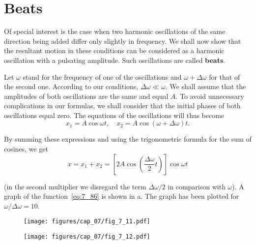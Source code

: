 \section{Beats}\label{sec:7_8}

Of special interest is the case when two harmonic oscillations of the same direction being added differ only slightly in frequency. We shall now show that the resultant motion in these conditions can be considered as a harmonic oscillation with a pulsating amplitude. Such oscillations are called \textbf{beats}.

Let $\omega$ stand for the frequency of one of the oscillations and $\omega+\Delta\omega$ for that of the second one. According to our conditions, $\Delta\omega\ll\omega$. We shall assume that the amplitudes of both oscillations are the same and equal $A$. To avoid unnecessary complications in our formulas, we shall consider that the initial phases of both oscillations equal zero. The equations of the oscillations will thus become
\begin{equation*}
	x_1 = A\cos\omega t,\quad x_2 = A\cos(\omega+\Delta\omega) t.
\end{equation*}

\noindent
By summing these expressions and using the trigonometric formula for the sum of cosines, we get
\begin{equation}\label{eq:7_86}
	x = x_1 + x_2 = \left[ 2A \cos\left(\frac{\Delta\omega}{2}t\right)\right] \cos\omega t
\end{equation}

\noindent
(in the second multiplier we disregard the term $\Delta\omega/2$ in comparison with $\omega$). A graph of the function~\eqref{eq:7_86} is shown in a. The graph has been plotted for $\omega/\Delta\omega=10$.

\begin{figure}[t]
	\begin{minipage}[t]{0.5\linewidth}
		\begin{center}
			\texttt{[image: figures/cap\_07/fig\_7\_11.pdf]}
			\caption[]{}
			\label{fig:7_11}
		\end{center}
	\end{minipage}
	\hspace{-0.0cm}
	\begin{minipage}[t]{0.5\linewidth}
		\begin{center}
			\texttt{[image: figures/cap\_07/fig\_7\_12.pdf]}
			\caption[]{}
			\label{fig:7_12}
		\end{center}
	\end{minipage}
	\vspace{-0.6cm}
\end{figure}

